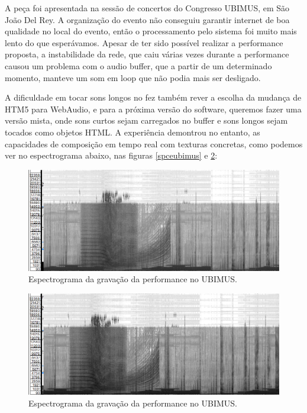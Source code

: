 A peça foi apresentada na sessão de concertos do Congresso UBIMUS, em São João Del Rey. A organização do evento não conseguiu garantir internet de boa qualidade no local do evento, então o processamento pelo sistema foi muito mais lento do que esperávamos. Apesar de ter sido possível realizar a performance proposta, a instabilidade da rede, que caiu várias vezes durante a performance causou um problema com o audio buffer, que a partir de um determinado momento, manteve um som em loop que não podia mais ser desligado.

A dificuldade em tocar sons longos no fez também rever a escolha da mudança de HTM5 para WebAudio, e para a próxima versão do software, queremos fazer uma versão mista, onde sons curtos sejam carregados no buffer e sons longos sejam tocados como objetos HTML. A experiência demontrou no entanto, as capacidades de composição em tempo real com texturas concretas, como podemos ver no espectrograma abaixo, nas figuras \ref{spceubimus} e \ref{spceubimusdt}:

\begin{figure}

\includegraphics[width=1\linewidth]{pictures/cap4/canibalspecdbv}
\caption{Espectrograma da gravação da performance no UBIMUS.}
\label{specubimus}
\end{figure}

\begin{figure}

\includegraphics[width=1\linewidth]{pictures/cap4/canibalspecdbvdt}
\caption{Espectrograma da gravação da performance no UBIMUS.}
\label{spceubimusdt}
\end{figure}

